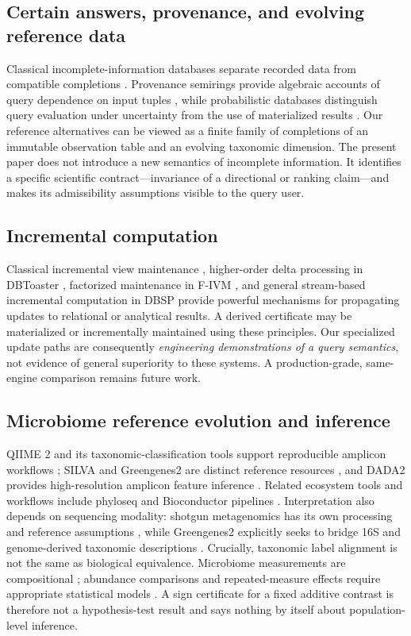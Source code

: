\documentclass[conference]{IEEEtran}
\begin{document}
\subsection{Certain answers, provenance, and evolving reference data}
Classical incomplete-information databases separate recorded data from compatible completions \cite{imielinski1984}. Provenance semirings provide algebraic accounts of query dependence on input tuples \cite{green2007}, while probabilistic databases distinguish query evaluation under uncertainty from the use of materialized results \cite{dalvi2011}. Our reference alternatives can be viewed as a finite family of completions of an immutable observation table and an evolving taxonomic dimension. The present paper does not introduce a new semantics of incomplete information. It identifies a specific scientific contract---invariance of a directional or ranking claim---and makes its admissibility assumptions visible to the query user.

\subsection{Incremental computation}
Classical incremental view maintenance \cite{gupta1993,guptamumick1995,guptablakeley1995}, higher-order delta processing in DBToaster \cite{ahmad2012}, factorized maintenance in F-IVM \cite{kara2024}, and general stream-based incremental computation in DBSP \cite{budiu2023,budiu2025} provide powerful mechanisms for propagating updates to relational or analytical results. A derived certificate may be materialized or incrementally maintained using these principles. Our specialized update paths are consequently \emph{engineering demonstrations of a query semantics}, not evidence of general superiority to these systems. A production-grade, same-engine comparison remains future work.

\subsection{Microbiome reference evolution and inference}
QIIME 2 and its taxonomic-classification tools support reproducible amplicon workflows \cite{bolyen2019,bokulich2018}; SILVA and Greengenes2 are distinct reference resources \cite{quast2013,mcdonald2024}, and DADA2 provides high-resolution amplicon feature inference \cite{callahan2016}. Related ecosystem tools and workflows include phyloseq and Bioconductor pipelines \cite{mcmurdie2013,callahan2016workflow}. Interpretation also depends on sequencing modality: shotgun metagenomics has its own processing and reference assumptions \cite{quince2017}, while Greengenes2 explicitly seeks to bridge 16S and genome-derived taxonomic descriptions \cite{mcdonald2024}. Crucially, taxonomic label alignment is not the same as biological equivalence. Microbiome measurements are compositional \cite{aitchison1982,gloor2017}; abundance comparisons and repeated-measure effects require appropriate statistical models \cite{lin2020,lin2024,weiss2017,mcmurdie2014,knight2018}. A sign certificate for a fixed additive contrast is therefore not a hypothesis-test result and says nothing by itself about population-level inference.
\end{document}
